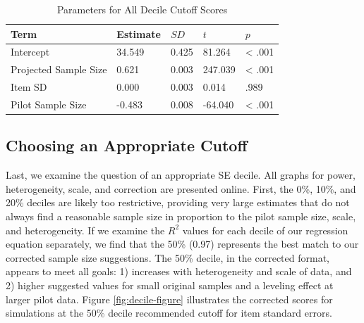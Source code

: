 \documentclass[
  man]{apa6}
\begin{document}
\begin{table}[tbp]

\begin{center}
\begin{threeparttable}

\caption{\label{tab:table-correction}Parameters for All Decile Cutoff Scores}

\begin{tabular}{lllll}
\toprule
Term & Estimate & $SD$ & $t$ & $p$\\
\midrule
Intercept & 34.549 & 0.425 & 81.264 & < .001\\
Projected Sample Size & 0.621 & 0.003 & 247.039 & < .001\\
Item SD & 0.000 & 0.003 & 0.014 & .989\\
Pilot Sample Size & -0.483 & 0.008 & -64.040 & < .001\\
\bottomrule
\end{tabular}

\end{threeparttable}
\end{center}

\end{table}

\hypertarget{choosing-an-appropriate-cutoff}{%
\subsection{Choosing an Appropriate Cutoff}\label{choosing-an-appropriate-cutoff}}

Last, we examine the question of an appropriate SE decile. All graphs for power, heterogeneity, scale, and correction are presented online. First, the 0\%, 10\%, and 20\% deciles are likely too restrictive, providing very large estimates that do not always find a reasonable sample size in proportion to the pilot sample size, scale, and heterogeneity. If we examine the \(R^2\) values for each decile of our regression equation separately, we find that the 50\% (0.97) represents the best match to our corrected sample size suggestions. The 50\% decile, in the corrected format, appears to meet all goals: 1) increases with heterogeneity and scale of data, and 2) higher suggested values for small original samples and a leveling effect at larger pilot data. Figure \ref{fig:decile-figure} illustrates the corrected scores for simulations at the 50\% decile recommended cutoff for item standard errors.
\end{document}
